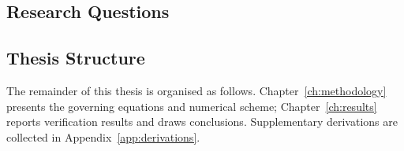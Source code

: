 \subsection{Research Questions}

\lipsum[8]

\subsection{Thesis Structure}

The remainder of this thesis is organised as follows. Chapter~\ref{ch:methodology} presents the governing equations and numerical scheme; Chapter~\ref{ch:results} reports verification results and draws conclusions. Supplementary derivations are collected in Appendix~\ref{app:derivations}.
